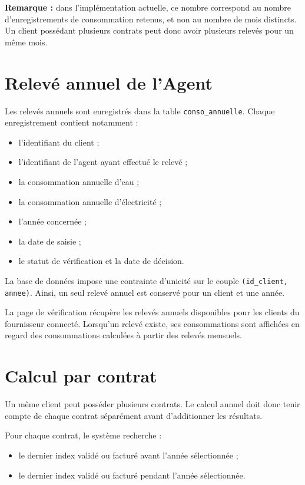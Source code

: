 \textbf{Remarque :} dans l'implémentation actuelle, ce nombre correspond au nombre d'enregistrements de consommation retenus, et non au nombre de mois distincts. Un client possédant plusieurs contrats peut donc avoir plusieurs relevés pour un même mois.

\section{Relevé annuel de l'Agent}

Les relevés annuels sont enregistrés dans la table \texttt{conso\_annuelle}. Chaque enregistrement contient notamment :
\begin{itemize}
    \item l'identifiant du client ;
    \item l'identifiant de l'agent ayant effectué le relevé ;
    \item la consommation annuelle d'eau ;
    \item la consommation annuelle d'électricité ;
    \item l'année concernée ;
    \item la date de saisie ;
    \item le statut de vérification et la date de décision.
\end{itemize}

La base de données impose une contrainte d'unicité sur le couple \texttt{(id\_client, annee)}. Ainsi, un seul relevé annuel est conservé pour un client et une année.

La page de vérification récupère les relevés annuels disponibles pour les clients du fournisseur connecté. Lorsqu'un relevé existe, ses consommations sont affichées en regard des consommations calculées à partir des relevés mensuels.

\section{Calcul par contrat}

Un même client peut posséder plusieurs contrats. Le calcul annuel doit donc tenir compte de chaque contrat séparément avant d'additionner les résultats.

Pour chaque contrat, le système recherche :
\begin{itemize}
    \item le dernier index validé ou facturé avant l'année sélectionnée ;
    \item le dernier index validé ou facturé pendant l'année sélectionnée.
\end{itemize}

